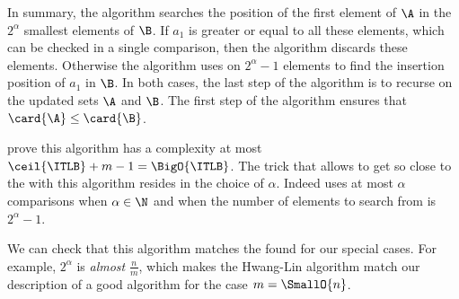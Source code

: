 In summary, the algorithm searches the position of the first element of \(\A\)
in the \(2^{\alpha}\) smallest elements of \(\B\). If \(a_1\) is greater or
equal to all these elements, which can be checked in a single comparison, then
the algorithm discards these elements. Otherwise the algorithm uses
\binarysearch on \(2^{\alpha}-1\) elements to find the insertion position of
\(a_1\) in \(\B\). In both cases, the last step of the algorithm is to recurse
on the updated sets \(\A\) and \(\B\). The first step of the algorithm ensures that
\(\card{\A} \le \card{\B}\).

\citet*{DBLP:journals/siamcomp/HwangL72} prove this algorithm has a complexity
at most \(\ceil{\ITLB} + m - 1 = \BigO{\ITLB}\). The trick that allows to
get so close to the \ITLB with this algorithm resides in the choice of
\(\alpha\). Indeed \binarysearch uses at most \(\alpha\) comparisons
when \(\alpha \in \N\) and when the number of elements to search
from is \(2^{\alpha}-1\).

We can check that this algorithm matches the \ITLB found for our
special cases. For example, \(2^\alpha\) is \emph{almost} \(\frac{n}{m}\),
which makes the Hwang-Lin algorithm match our description of a good algorithm
for the case \(m = \SmallO{n}\).
